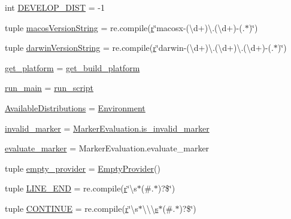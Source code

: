 \begin{DoxyCompactItemize}
int \hyperlink{namespacepkg__resources_a3831b5c990f62e01f97b3a4f33a75a83}{D\+E\+V\+E\+L\+O\+P\+\_\+\+D\+I\+S\+T} = -\/1
\item 
tuple \hyperlink{namespacepkg__resources_a7449327da8c51c25a18a5bc9c46b0820}{macos\+Version\+String} = re.\+compile(\hyperlink{indexexpr_8h_ac434fd11cc2493608d8d91424d60c17e}{r}\char`\"{}macosx-\/(\textbackslash{}d+)\textbackslash{}.(\textbackslash{}d+)-\/(.$\ast$)\char`\"{})
\item 
tuple \hyperlink{namespacepkg__resources_a6404062b96457d0de8553d4fb6654557}{darwin\+Version\+String} = re.\+compile(\hyperlink{indexexpr_8h_ac434fd11cc2493608d8d91424d60c17e}{r}\char`\"{}darwin-\/(\textbackslash{}d+)\textbackslash{}.(\textbackslash{}d+)\textbackslash{}.(\textbackslash{}d+)-\/(.$\ast$)\char`\"{})
\item 
\hyperlink{namespacepkg__resources_aed6997ba900a5733dcb3ebe4492eaa83}{get\+\_\+platform} = \hyperlink{namespacepkg__resources_afeca82ef5e1a8f269c93392a0ffd64c1}{get\+\_\+build\+\_\+platform}
\item 
\hyperlink{namespacepkg__resources_a49c454f5d7f8e48dea964b635ff91968}{run\+\_\+main} = \hyperlink{namespacepkg__resources_a0932ef76c1744247fcf831d0bcbcaad6}{run\+\_\+script}
\item 
\hyperlink{namespacepkg__resources_ab2650bbd95cc1c4076b7853c43c97cf9}{Available\+Distributions} = \hyperlink{classpkg__resources_1_1Environment}{Environment}
\item 
\hyperlink{namespacepkg__resources_a1331f971b3e1d2e7635edde4a025e72f}{invalid\+\_\+marker} = \hyperlink{classpkg__resources_1_1MarkerEvaluation_a17f4d9547243c02d90238b5f3b3ac134}{Marker\+Evaluation.\+is\+\_\+invalid\+\_\+marker}
\item 
\hyperlink{namespacepkg__resources_abd062a5f98d02acdc1ef833394d311eb}{evaluate\+\_\+marker} = Marker\+Evaluation.\+evaluate\+\_\+marker
\item 
tuple \hyperlink{namespacepkg__resources_a1f22b99f4d3fd3ba7a293a9e53351377}{empty\+\_\+provider} = \hyperlink{classpkg__resources_1_1EmptyProvider}{Empty\+Provider}()
\item 
tuple \hyperlink{namespacepkg__resources_a2d5191a95b610ccb4136b29578ce05d4}{L\+I\+N\+E\+\_\+\+E\+N\+D} = re.\+compile(\hyperlink{indexexpr_8h_ac434fd11cc2493608d8d91424d60c17e}{r}\char`\"{}\textbackslash{}s$\ast$(\#.$\ast$)?\$\char`\"{})
\item 
tuple \hyperlink{namespacepkg__resources_ae001575ac77e85aa6f9e5434d1cdb7a3}{C\+O\+N\+T\+I\+N\+U\+E} = re.\+compile(\hyperlink{indexexpr_8h_ac434fd11cc2493608d8d91424d60c17e}{r}\char`\"{}\textbackslash{}s$\ast$\textbackslash{}\textbackslash{}\textbackslash{}\hyperlink{indexexpr_8h_ae024b0db549122b44c349ae28ec990dc}{s}$\ast$(\#.$\ast$)?\$\char`\"{})

\end{DoxyCompactItemize}

